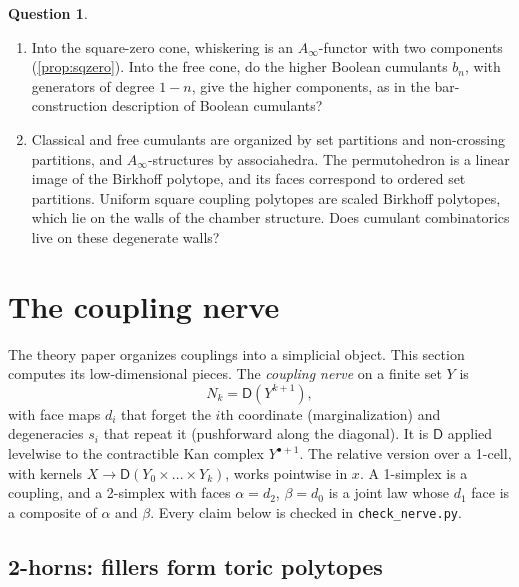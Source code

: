 \documentclass[11pt]{article}
\theoremstyle{definition}
\newtheorem{question}[theorem]{Question}
\theoremstyle{remark}
\newcommand{\D}{\mathsf{D}}
\begin{document}
\begin{question}\label{q:cumulants}
\leavevmode
\begin{enumerate}[label=(\roman*),leftmargin=*]
\item Into the square-zero cone, whiskering is an $A_\infty$-functor with two components
  (\cref{prop:sqzero}). Into the free cone, do the higher Boolean cumulants $b_n$, with generators of degree
  $1-n$, give the higher components, as in the bar-construction description of Boolean cumulants?
\item Classical and free cumulants are organized by set partitions and non-crossing partitions, and
  $A_\infty$-structures by associahedra. The permutohedron is a linear image of the Birkhoff polytope, and its
  faces correspond to ordered set partitions. Uniform square coupling polytopes are scaled Birkhoff
  polytopes, which lie on the walls of the chamber structure. Does cumulant combinatorics live on these
  degenerate walls?
\end{enumerate}
\end{question}

\section{The coupling nerve}\label{sec:nerve}

The theory paper \cite{Conditionals} organizes couplings into a simplicial object. This section computes
its low-dimensional pieces. The \emph{coupling nerve} on a finite set $Y$ is
\[
N_k=\D(Y^{k+1}),
\]
with face maps $d_i$ that forget the $i$th coordinate (marginalization) and degeneracies $s_i$ that repeat it
(pushforward along the diagonal). It is $\D$ applied levelwise to the contractible Kan complex $Y^{\bullet+1}$.
The relative version over a 1-cell, with kernels $X\to\D(Y_0\times\dots\times Y_k)$, works pointwise in $x$. A
1-simplex is a coupling, and a 2-simplex with faces $\alpha=d_2$, $\beta=d_0$ is a joint law whose $d_1$ face is a
composite of $\alpha$ and $\beta$. Every claim below is checked in \texttt{check\_nerve.py}.

\subsection{2-horns: fillers form toric polytopes}
\end{document}

